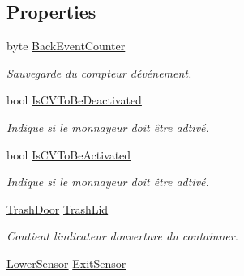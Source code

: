 \subsection*{Properties}
\begin{DoxyCompactItemize}
\item 
byte \mbox{\hyperlink{class_device_library_1_1_c_coin_validator_a8547317bb187fe7e1fa247b64bc94ed1}{Back\+Event\+Counter}}
\begin{DoxyCompactList}\small\item\em Sauvegarde du compteur d\textquotesingle{}événement. \end{DoxyCompactList}\item 
bool \mbox{\hyperlink{class_device_library_1_1_c_coin_validator_af41e76ebe686da650b5a12ab034309ec}{Is\+C\+V\+To\+Be\+Deactivated}}
\begin{DoxyCompactList}\small\item\em Indique si le monnayeur doit être adtivé. \end{DoxyCompactList}\item 
bool \mbox{\hyperlink{class_device_library_1_1_c_coin_validator_a6fe7522091654bc85951ad9f234b7585}{Is\+C\+V\+To\+Be\+Activated}}
\begin{DoxyCompactList}\small\item\em Indique si le monnayeur doit être adtivé. \end{DoxyCompactList}\item 
\mbox{\hyperlink{class_device_library_1_1_c_coin_validator_aec7d217f486dbce4458a64bc071fa19d}{Trash\+Door}} \mbox{\hyperlink{class_device_library_1_1_c_coin_validator_aec2db3e243a0eb073f5392c41ee0c354}{Trash\+Lid}}
\begin{DoxyCompactList}\small\item\em Contient l\textquotesingle{}indicateur d\textquotesingle{}ouverture du containner. \end{DoxyCompactList}\item 
\mbox{\hyperlink{class_device_library_1_1_c_coin_validator_ab4d515bda1d8e8679ed7dc4cc3f5c40c}{Lower\+Sensor}} \mbox{\hyperlink{class_device_library_1_1_c_coin_validator_a394bb70d5bee7bb9abbe32e332a49071}{Exit\+Sensor}}

\end{DoxyCompactItemize}

